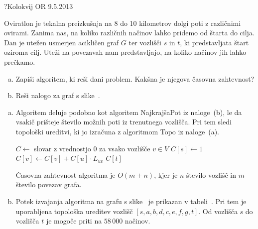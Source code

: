 \begin{naloga}{?}{Kolokvij OR 9.5.2013}
\begin{vprasanje}
Oviratlon je tekalna preizkušnja
na 8 do 10 kilometrov dolgi poti z različnimi ovirami.
Zanima nas, na koliko različnih načinov lahko pridemo od štarta do cilja.
Dan je utežen usmerjen acikličen graf $G$ ter vozlišči $s$ in $t$,
ki predstavljata štart oziroma cilj.
Uteži na povezavah nam predstavljajo,
na koliko načinov jih lahko prečkamo.

\begin{enumerate}[(a)]
\item Zapiši algoritem, ki reši dani problem.
Kakšna je njegova časovna zahtevnost?

\item Reši nalogo za graf s slike~\fig.
\end{enumerate}

\begin{slika}
\pgfslika
{}
\end{slika}
\end{vprasanje}

\begin{odgovor}
\begin{enumerate}[(a)]
\item Algoritem deluje podobno kot algoritem {\sc NajkrajšaPot}
iz naloge~\res[topo]{}(b),
le da vsakič prišteje število možnih poti iz trenutnega vozlišča.
Pri tem sledi topološki ureditvi,
ki jo izračuna z algoritmom {\sc Topo} iz naloge~\res[topo]{}(a).
\begin{small}
\begin{algorithmic}
\State $C \gets$ slovar z vrednostjo $0$ za vsako vozlišče $v \in V$
\State $C[s] \gets 1$
        \State $C[v] \gets C[v] + C[u] \cdot L_{uv}$
    \EndFor
\EndFor
\State \Return $C[t]$
\EndFunction
\end{algorithmic}
\end{small}
Časovna zahtevnost algoritma je $O(m + n)$,
kjer je $n$ število vozlišč in $m$ število povezav grafa.

\item Potek izvajanja algoritma na grafu s slike~\fig
je prikazan v tabeli~\tab.
Pri tem je uporabljena topološka ureditev vozlišč
$[s, a, b, d, c, e, f, g, t]$.
Od vozlišča $s$ do vozlišča $t$ je mogoče priti na $58\,000$ načinov.
\end{enumerate}


\end{odgovor}
\end{naloga}
